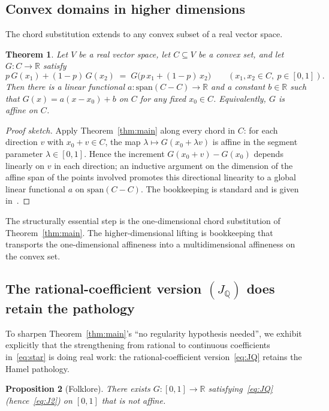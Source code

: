 \documentclass[review,12pt,a4paper]{elsarticle}
\newtheorem{theorem}{Theorem}[section]
\newtheorem{proposition}[theorem]{Proposition}
\theoremstyle{remark}
\newcommand{\R}{\mathbb R}
\newcommand{\Q}{\mathbb Q}
\begin{document}
\subsection{Convex domains in higher dimensions}
\label{ssec:higher}

The chord substitution extends to any convex subset of a real vector space.

\begin{theorem}\label{thm:higher}
Let $V$ be a real vector space, let $C\subseteq V$ be a convex set, and
let $G\colon C\to\R$ satisfy
\[
p\,G(x_1)+(1-p)\,G(x_2) \;=\; G\bigl(p\,x_1+(1-p)\,x_2\bigr)
\qquad (x_1,x_2\in C,\ p\in[0,1]).
\]
Then there is a linear functional $a\colon\mathrm{span}(C-C)\to\R$ and a
constant $b\in\R$ such that $G(x)=a(x-x_0)+b$ on $C$ for any fixed
$x_0\in C$. Equivalently, $G$ is affine on $C$.
\end{theorem}

\begin{proof}[Proof sketch]
Apply Theorem~\ref{thm:main} along every chord in $C$: for each direction
$v$ with $x_0+v\in C$, the map $\lambda\mapsto G(x_0+\lambda v)$ is affine
in the segment parameter $\lambda\in[0,1]$. Hence the increment
$G(x_0+v)-G(x_0)$ depends linearly on $v$ in each direction; an inductive
argument on the dimension of the affine span of the points involved
promotes this directional linearity to a global linear functional $a$ on
$\mathrm{span}(C-C)$. The bookkeeping is standard and is given
in~\cite[Ch.~13]{AczelDhombres1989}.
\end{proof}

The structurally essential step is the one-dimensional chord substitution
of Theorem~\ref{thm:main}. The higher-dimensional lifting is bookkeeping
that transports the one-dimensional affineness into a multidimensional
affineness on the convex set.

\subsection{The rational-coefficient version $(J_{\Q})$ does retain the pathology}
\label{ssec:JQ-pathology}

To sharpen Theorem~\ref{thm:main}'s ``no regularity hypothesis needed'',
we exhibit explicitly that the strengthening from rational to continuous
coefficients in~\eqref{eq:star} is doing real work: the rational-coefficient
version~\eqref{eq:JQ} retains the Hamel pathology.

\begin{proposition}[Folklore]\label{prop:JQ-pathology}
There exists $G\colon[0,1]\to\R$ satisfying~\eqref{eq:JQ}
(hence~\eqref{eq:J2}) on $[0,1]$ that is not affine.
\end{proposition}
\end{document}
